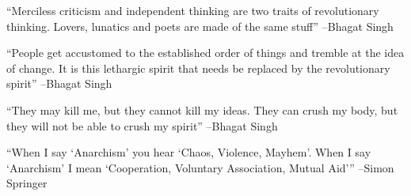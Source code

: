 \documentclass{article}%
\begin{document}
\linebreak%
\vspace{1mm}%
\begin{minipage}{\textwidth}%
\flushleft%
“Merciless criticism and independent thinking are two traits of revolutionary thinking. Lovers, lunatics and poets are made of the same stuff”%
\linebreak%
\vspace{1mm}%
–Bhagat Singh%
\linebreak%
\vspace{1mm}%
\end{minipage}%
\linebreak%
\vspace{1mm}%
\begin{minipage}{\textwidth}%
\flushleft%
“People get accustomed to the established order of things and tremble at the idea of change. It is this lethargic spirit that needs be replaced by the revolutionary spirit”%
\linebreak%
\vspace{1mm}%
–Bhagat Singh%
\linebreak%
\vspace{1mm}%
\end{minipage}%
\linebreak%
\vspace{1mm}%
\begin{minipage}{\textwidth}%
\flushleft%
“They may kill me, but they cannot kill my ideas. They can crush my body, but they will not be able to crush my spirit”%
\linebreak%
\vspace{1mm}%
–Bhagat Singh%
\linebreak%
\vspace{1mm}%
\end{minipage}%
\linebreak%
\vspace{1mm}%
\begin{minipage}{\textwidth}%
\flushleft%
“When I say ‘Anarchism’ you hear ‘Chaos, Violence, Mayhem’. When I say ‘Anarchism’ I mean ‘Cooperation, Voluntary Association, Mutual Aid’”%
\linebreak%
\vspace{1mm}%
–Simon Springer%
\linebreak%
\vspace{1mm}%
\end{minipage}%
\linebreak%
\vspace{1mm}%
\end{document}

